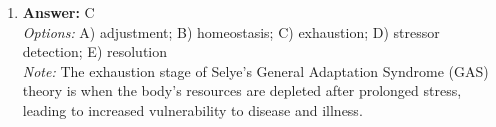 \documentclass[12pt]{article}
\begin{document}
\begin{enumerate}[label=\arabic*.]
\\ \textit{Options:} A) behavior therapy; B) Exposure therapy; C) cognitive therapy; D) psychoanalysis; E) Rational emotive behavior therapy
\\ \textit{Note:} The correct answer is behavior therapy because the therapist's affirmative nodding and verbal cues indicate active listening and reinforcement of Amy's behavior in expressing her thoughts and feelings, which are key components of behavior therapy techniques.
\item \textbf{Answer:} C
\\ \textit{Options:} A) adjustment; B) homeostasis; C) exhaustion; D) stressor detection; E) resolution
\\ \textit{Note:} The exhaustion stage of Selye's General Adaptation Syndrome (GAS) theory is when the body's resources are depleted after prolonged stress, leading to increased vulnerability to disease and illness.
\end{enumerate}
\end{document}
